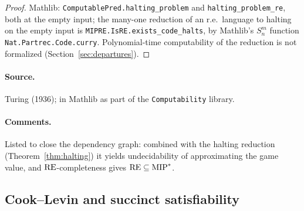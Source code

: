 \begin{proof}
\leanok
Mathlib: \texttt{ComputablePred.halting\_problem} and \texttt{halting\_problem\_re}, both
at the empty input; the many-one reduction of an r.e.\ language to halting on the empty input
is \texttt{MIPRE.IsRE.exists\_code\_halts}, by Mathlib's $S^m_n$ function
\texttt{Nat.Partrec.Code.curry}. Polynomial-time computability of the reduction is not
formalized (Section~\ref{sec:departures}).
\end{proof}

\paragraph{Source.} Turing (1936); in Mathlib as part of the
\texttt{Computability} library.

\paragraph{Comments.} Listed to close the dependency graph: combined with the halting
reduction (Theorem~\ref{thm:halting}) it yields undecidability of approximating the
game value, and $\mathrm{RE}$-completeness gives $\mathrm{RE} \subseteq \mathrm{MIP}^*$.

\subsection{Cook--Levin and succinct satisfiability}
\label{sec:rr-cook-levin}

\effortHard

